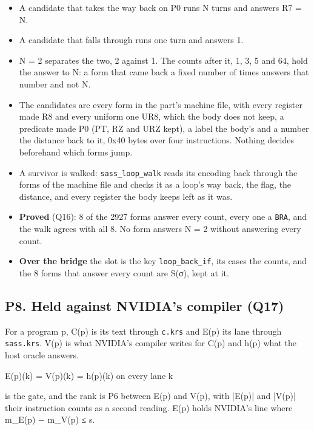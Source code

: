 \begin{itemize}
\item A candidate that takes the way back on P0 runs N turns and answers R7 = N.
\item A candidate that falls through runs one turn and answers 1.
\item N = 2 separates the two, 2 against 1. The counts after it, 1, 3, 5 and 64, hold the answer to N: a form that came back a fixed number of times answers that number and not N.
\item The candidates are every form in the part's machine file, with every register made R8 and every uniform one UR8, which the body does not keep, a predicate made P0 (PT, RZ and URZ kept), a label the body's and a number the distance back to it, 0x40 bytes over four instructions. Nothing decides beforehand which forms jump.
\item A survivor is walked: \texttt{sass\_\allowbreak{}loop\_\allowbreak{}walk} reads its encoding back through the forms of the machine file and checks it as a loop's way back, the flag, the distance, and every register the body keeps left as it was.
\item \textbf{Proved} (Q16): 8 of the 2927 forms answer every count, every one a \texttt{BRA}, and the walk agrees with all 8. No form answers N = 2 without answering every count.
\item \textbf{Over the bridge} the slot is the key \texttt{loop\_\allowbreak{}back\_\allowbreak{}if}, its cases the counts, and the 8 forms that answer every count are S(σ), kept at it.
\end{itemize}

\subsection{\texorpdfstring{P8. Held against NVIDIA's compiler (Q17)}{P8. Held against NVIDIA's compiler (Q17)}}

For a program p, C(p) is its text through \texttt{c.\allowbreak{}krs} and E(p) its lane through \texttt{sass.\allowbreak{}krs}. V(p) is what NVIDIA's compiler writes for C(p) and h(p) what the host oracle answers.

E(p)(k) = V(p)(k) = h(p)(k) on every lane k

is the gate, and the rank is P6 between E(p) and V(p), with |E(p)| and |V(p)| their instruction counts as a second reading. E(p) holds NVIDIA's line where m\_\allowbreak{}E(p) − m\_\allowbreak{}V(p) ≤ s.

